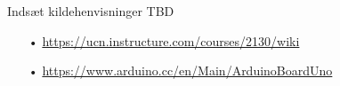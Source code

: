Indsæt kildehenvisninger TBD
\begin{enumerate}
	\item[•] \url{https://ucn.instructure.com/courses/2130/wiki}
	\item[•] \url{https://www.arduino.cc/en/Main/ArduinoBoardUno}
\end{enumerate}


